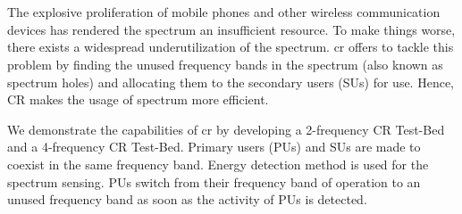 \chapter*{}
The explosive proliferation of mobile phones and other wireless communication
devices has rendered the spectrum an insufficient resource. To make things
worse, there exists a widespread underutilization of the spectrum. \gls{cr}
offers to tackle this problem by finding the unused frequency bands
in the spectrum (also known as spectrum holes) and allocating them to the
secondary users (SUs) for use. Hence, CR makes the usage of spectrum more
efficient.

We demonstrate the capabilities of \gls{cr} by developing a 2-frequency CR Test-Bed
and a 4-frequency CR Test-Bed. Primary users (PUs) and SUs are made to
coexist in the same frequency band. Energy detection method is used for the
spectrum sensing. PUs switch from their frequency band of operation to an
unused frequency band as soon as the activity of PUs is detected.